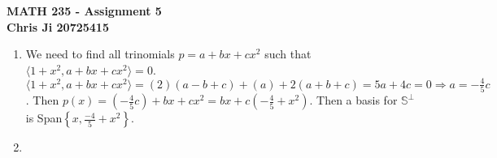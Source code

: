 \documentclass[10pt,english]{article}
\begin{document}
\noindent \begin{center}
\textbf{\large{}MATH 235 - Assignment 5}\\
\textbf{\large{}Chris Ji 20725415}
\par\end{center}{\large \par}
\medskip{}

\begin{enumerate}
\item We need to find all trinomials $p=a+bx+cx^2$ such that $\langle 1+x^2,a+bx+cx^2\rangle=0$. $\langle1+x^2,a+bx+cx^2\rangle=(2)(a-b+c)+(a)+2(a+b+c)=5a+4c=0\Rightarrow a=-\frac{4}{5}c$. Then $p(x)=(-\frac{4}{5}c)+bx+cx^2=bx+c(-\frac{4}{5}+x^2)$. Then a basis for $\mathbb{S}^\perp$ is Span$\left\{x,\frac{-4}{5}+x^2\right\}$.

\pagebreak
\item \begin{enumerate}

\end{enumerate}
\end{enumerate}
\end{document}
